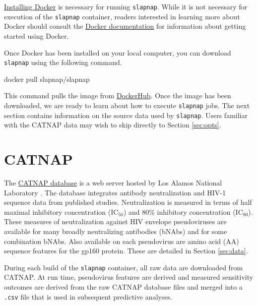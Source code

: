 \documentclass[]{article}
\newenvironment{Shaded}{\begin{snugshade}}{\end{snugshade}}
\newcommand{\ExtensionTok}[1]{#1}
\newcommand{\NormalTok}[1]{#1}
\begin{document}
\href{https://docs.docker.com/docker-for-windows/install/}{Installing
Docker} is necessary for running \texttt{slapnap}. While it is not
necessary for execution of the \texttt{slapnap} container, readers
interested in learning more about Docker should consult the
\href{https://docs.docker.com/get-started/}{Docker documentation} for
information about getting started using Docker.

Once Docker has been installed on your local computer, you can download
\texttt{slapnap} using the following command.

\begin{Shaded}
\begin{Highlighting}[]
\ExtensionTok{docker}\NormalTok{ pull slapnap/slapnap}
\end{Highlighting}
\end{Shaded}

This command pulls the image from
\href{https://hub.docker.com/}{DockerHub}. Once the image has been
downloaded, we are ready to learn about how to execute \texttt{slapnap}
jobs. The next section contains information on the source data used by
\texttt{slapnap}. Users familiar with the CATNAP data may wish to skip
directly to Section \ref{sec:opts}.

\section{CATNAP}\label{sec:catnap}

The
\href{https://www.hiv.lanl.gov/components/sequence/HIV/neutralization/index.html}{CATNAP
database} is a web server hosted by Los Alamos National Laboratory
\citep{yoon2015catnap}. The database integrates antibody neutralization
and HIV-1 sequence data from published studies. Neutralization is
measured in terms of half maximal inhibitory concentration (IC\(_{50}\))
and 80\% inhibitory concentration (IC\(_{80}\)). These measures of
neutralization against HIV envelope pseudoviruses are available for many
broadly neutralizing antibodies (bNAbs) and for some combination bNAbs.
Also available on each pseudovirus are amino acid (AA) sequence features
for the gp160 protein. These are detailed in Section \ref{sec:data}.

During each build of the \texttt{slapnap} container, all raw data are
downloaded from CATNAP. At run time, pseudovirus features are derived
and measured sensitivity outcomes are derived from the raw CATNAP
database files and merged into a \texttt{.csv} file that is used in
subsequent predictive analyses.
\end{document}
